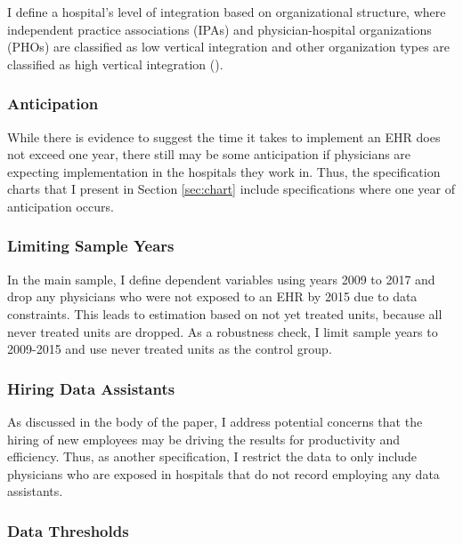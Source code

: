 \documentclass[12pt]{article}
\begin{document}
I define a hospital's level of integration based on organizational structure, where independent practice associations (IPAs) and physician-hospital organizations (PHOs) are classified as low vertical integration and other organization types are classified as high vertical integration (\cite{dynan1998assessing}). 



\subsubsection{Anticipation}\label{app:anticipation}

While there is evidence to suggest the time it takes to implement an EHR does not exceed one year, there still may be some anticipation if physicians are expecting implementation in the hospitals they work in. Thus, the specification charts that I present in Section \ref{sec:chart} include specifications where one year of anticipation occurs. 

\subsubsection{Limiting Sample Years}\label{app:years}

In the main sample, I define dependent variables using years 2009 to 2017 and drop any physicians who were not exposed to an EHR by 2015 due to data constraints. This leads to estimation based on not yet treated units, because all never treated units are dropped. As a robustness check, I limit sample years to 2009-2015 and use never treated units as the control group. 

\subsubsection{Hiring Data Assistants}

As discussed in the body of the paper, I address potential concerns that the hiring of new employees may be driving the results for productivity and efficiency. Thus, as another specification, I restrict the data to only include physicians who are exposed in hospitals that do not record employing any data assistants. 

\subsubsection{Data Thresholds}
\end{document}
